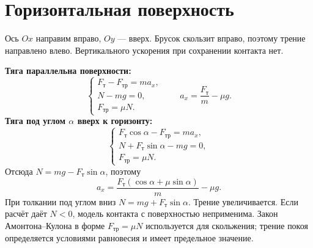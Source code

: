 \documentclass[a4paper,12pt]{article}
\newcommand{\fr}{F_{\text{тр}}}
\newcommand{\ft}{F_{\text{т}}}
\newcommand{\unit}[1]{\,\text{#1}}
\newcommand{\N}{\unit{Н}}
\begin{document}
\section{Горизонтальная поверхность}
Ось $Ox$ направим вправо, $Oy$ --- вверх. Брусок скользит вправо, поэтому трение направлено влево. Вертикального ускорения при сохранении контакта нет.
\begin{center}
\end{center}
\textbf{Тяга параллельна поверхности:}
\[\begin{cases}\ft-\fr=ma_x,\\N-mg=0,\\\fr=\mu N.\end{cases}\qquad a_x=\frac{\ft}{m}-\mu g.\]
\textbf{Тяга под углом $\alpha$ вверх к горизонту:}
\[\begin{cases}\ft\cos\alpha-\fr=ma_x,\\N+\ft\sin\alpha-mg=0,\\\fr=\mu N.\end{cases}\]
Отсюда $N=mg-\ft\sin\alpha$, поэтому
\[a_x=\frac{\ft(\cos\alpha+\mu\sin\alpha)}m-\mu g.\]
При толкании под углом вниз $N=mg+\ft\sin\alpha$. Трение увеличивается. Если расчёт даёт $N<0$, модель контакта с поверхностью неприменима. Закон Амонтона--Кулона в форме $\fr=\mu N$ используется для скольжения; трение покоя определяется условиями равновесия и имеет предельное значение.
\clearpage
\end{document}
